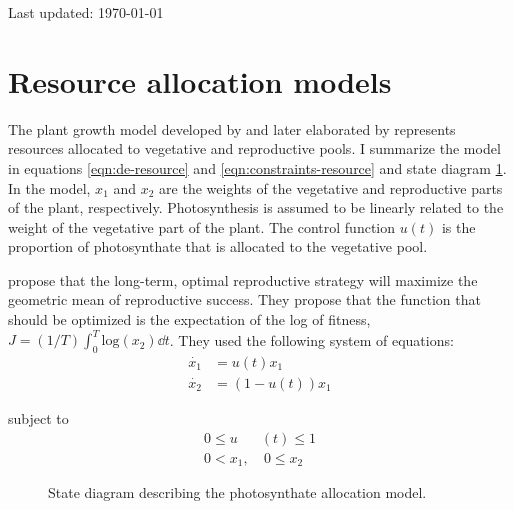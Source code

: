 \documentclass[12pt, oneside]{article}   	%
\begin{document}
 
 
   	Last updated: \today

\section*{Resource allocation models}

The plant growth model developed by \cite{cohen1971} and later elaborated by \cite{King1982a} represents resources allocated to vegetative and reproductive pools. I summarize the model in equations \ref{eqn:de-resource} and \ref{eqn:constraints-resource} and state diagram \ref{fig:state-resource}. In the model, $x_1$ and $x_2$ are the weights of the vegetative and reproductive parts of the plant, respectively. Photosynthesis is assumed to be linearly related to the weight of the vegetative part of the plant. The control function $u(t)$ is the proportion of photosynthate that is allocated to the vegetative pool.

\cite{King1982a} propose that the long-term, optimal reproductive strategy will maximize the geometric mean of reproductive success. They propose that the function that should be optimized is the expectation of the log of fitness, $ J = (1/T) \int_{0}^{T} \mathrm{log}(x_2) \dd {t}$. They used the following system of equations:
%
\begin{align}
\dot{x_1} & = u(t) x_1 \nonumber \\
\dot{x_2} & = (1-u(t)) x_1 
\label{eqn:de-resource}
\end{align}

\noindent subject to
%
\begin{align}
0 \leq u&(t)  \leq 1 \nonumber \\
0  < x_1,&\ 0  \leq x_2 
\label{eqn:constraints-resource}
\end{align}

\begin{figure}[!h]
\centering
{}
  \caption{State diagram describing the photosynthate allocation model.}
  \label{fig:state-resource}
\end{figure}
\end{document}
